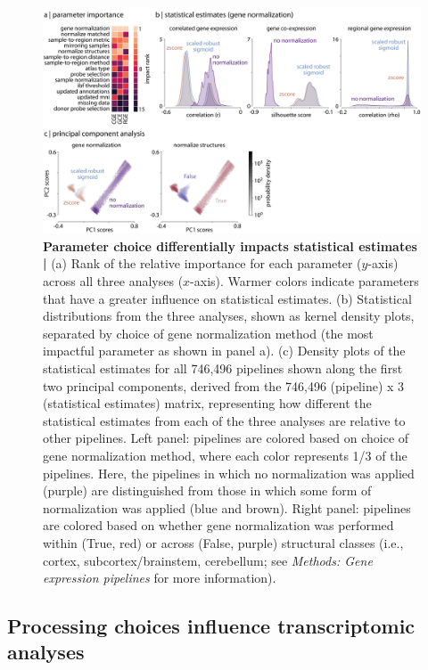 \documentclass[12pt,aps,pra,reprint,showkeys]{revtex4-1}
\begin{document}
\begin{figure}[htp]
  \begin{center}
    \centerline{\includegraphics[width=\textwidth]{parameter_impact.png}}
    \caption{
      \textbf{Parameter choice differentially impacts statistical estimates |}
      (a) Rank of the relative importance for each parameter ($y$-axis) across all three analyses ($x$-axis).
      Warmer colors indicate parameters that have a greater influence on statistical estimates.
      (b) Statistical distributions from the three analyses, shown as kernel density plots, separated by choice of gene normalization method (the most impactful parameter as shown in panel a).
      (c) Density plots of the statistical estimates for all 746,496 pipelines shown along the first two principal components, derived from the 746,496 (pipeline) x 3 (statistical estimates) matrix, representing how different the statistical estimates from each of the three analyses are relative to other pipelines.
      Left panel: pipelines are colored based on choice of gene normalization method, where each color represents 1/3 of the pipelines.
      Here, the pipelines in which no normalization was applied (purple) are distinguished from those in which some form of normalization was applied (blue and brown).
      Right panel: pipelines are colored based on whether gene normalization was performed within (True, red) or across (False, purple) structural classes (i.e., cortex, subcortex/brainstem, cerebellum; see \emph{Methods: Gene expression pipelines} for more information).
      }
    \label{figure-parameter-impact}
  \end{center}
\end{figure}

\subsection*{Processing choices influence transcriptomic analyses}
\end{document}

